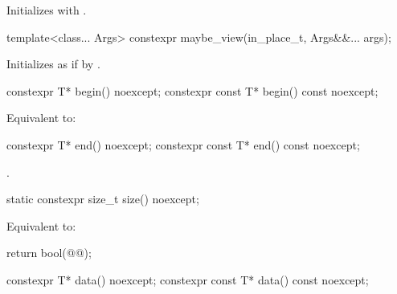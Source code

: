 \documentclass[a4paper,10pt,oneside,openany,final,article]{memoir}
\begin{document}
\begin{wording}
\begin{itemdescr}
  \pnum{}
  \effects{}
  Initializes  with .
\end{itemdescr}

\begin{itemdecl}
  template<class... Args>
  constexpr maybe_view(in_place_t, Args&&... args);
\end{itemdecl}

\begin{itemdescr}
  \pnum{}
  \effects
  Initializes  as if by
  .
\end{itemdescr}

\begin{itemdecl}
  constexpr T* begin() noexcept;
  constexpr const T* begin() const noexcept;
\end{itemdecl}

\begin{itemdescr}
  \pnum
  \effects
  Equivalent to: 
\end{itemdescr}

\begin{itemdecl}
  constexpr T* end() noexcept;
  constexpr const T* end() const noexcept;
\end{itemdecl}

\begin{itemdescr}
  \pnum{}
  \returns {}.
\end{itemdescr}

\begin{itemdecl}
  static constexpr size_t size() noexcept;
\end{itemdecl}

\begin{itemdescr}
  \pnum{}
  \effects{}
  Equivalent to:

  \begin{codeblock}
    return bool(@@);
  \end{codeblock}
\end{itemdescr}

\begin{itemdecl}
  constexpr T* data() noexcept;
  constexpr const T* data() const noexcept;
\end{itemdecl}

\begin{itemdescr}
  \pnum{}
  \returns {}
\end{itemdescr}


\end{wording}
\end{document}
